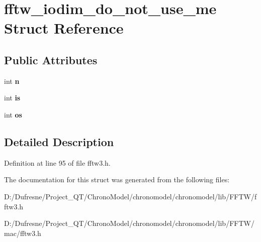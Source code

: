 \hypertarget{structfftw__iodim__do__not__use__me}{\section{fftw\-\_\-iodim\-\_\-do\-\_\-not\-\_\-use\-\_\-me Struct Reference}
\label{structfftw__iodim__do__not__use__me}
}
\subsection*{Public Attributes}
\begin{DoxyCompactItemize}
\item 
\hypertarget{structfftw__iodim__do__not__use__me_aa9ceb61afc1731380bdb48305aa40ce0}{int {\bfseries n}}\label{structfftw__iodim__do__not__use__me_aa9ceb61afc1731380bdb48305aa40ce0}

\item 
\hypertarget{structfftw__iodim__do__not__use__me_a7571fd050be3b9c9486d41086b657099}{int {\bfseries is}}\label{structfftw__iodim__do__not__use__me_a7571fd050be3b9c9486d41086b657099}

\item 
\hypertarget{structfftw__iodim__do__not__use__me_acff6a6b2225f610d3bee5380e801abb4}{int {\bfseries os}}\label{structfftw__iodim__do__not__use__me_acff6a6b2225f610d3bee5380e801abb4}

\end{DoxyCompactItemize}


\subsection{Detailed Description}


Definition at line 95 of file fftw3.\-h.



The documentation for this struct was generated from the following files\-:\begin{DoxyCompactItemize}
\item 
D\-:/\-Dufresne/\-Project\-\_\-\-Q\-T/\-Chrono\-Model/chronomodel/chronomodel/lib/\-F\-F\-T\-W/fftw3.\-h\item 
D\-:/\-Dufresne/\-Project\-\_\-\-Q\-T/\-Chrono\-Model/chronomodel/chronomodel/lib/\-F\-F\-T\-W/mac/fftw3.\-h\end{DoxyCompactItemize}
